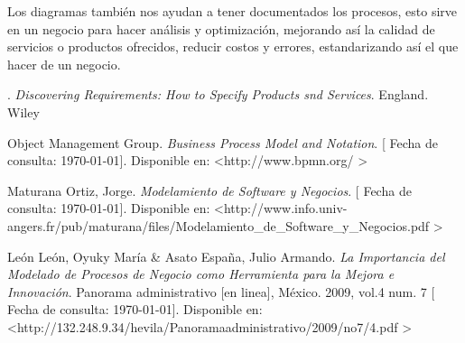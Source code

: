 \documentclass[spanish,12pt,letterpapper]{article}
\begin{document}
	Los diagramas también nos ayudan a tener documentados los procesos, esto sirve en un negocio para hacer análisis y optimización, mejorando así la calidad de servicios o productos ofrecidos, reducir costos y errores, estandarizando así el que hacer de un negocio. 
	

	\pagebreak
	\begin{thebibliography}{9}
	 . 
		\emph{Discovering Requirements: How to Specify Products snd Services}. England. Wiley
	
	 Object Management Group. 
		\emph{Business Process Model and Notation}. {[} Fecha de consulta: \today {]}. Disponible en: \textless http://www.bpmn.org/ \textgreater	
	
		 Maturana Ortiz, Jorge. 
		\emph{Modelamiento de Software y Negocios}. {[} Fecha de consulta: \today {]}. Disponible en: \textless http://www.info.univ-angers.fr/pub/maturana/files/Modelamiento\_de\_Software\_y\_Negocios.pdf \textgreater
		
		 León León, Oyuky María \& Asato España, Julio Armando. 
		\emph{La Importancia del Modelado de Procesos de
			Negocio como Herramienta para la Mejora e
			Innovación}. Panorama administrativo {[}en linea{]}, México. 2009, vol.4 num. 7  {[} Fecha de consulta: \today {]}. Disponible en: \textless http://132.248.9.34/hevila/Panoramaadministrativo/2009/no7/4.pdf \textgreater
	\end{thebibliography}
\end{document}
